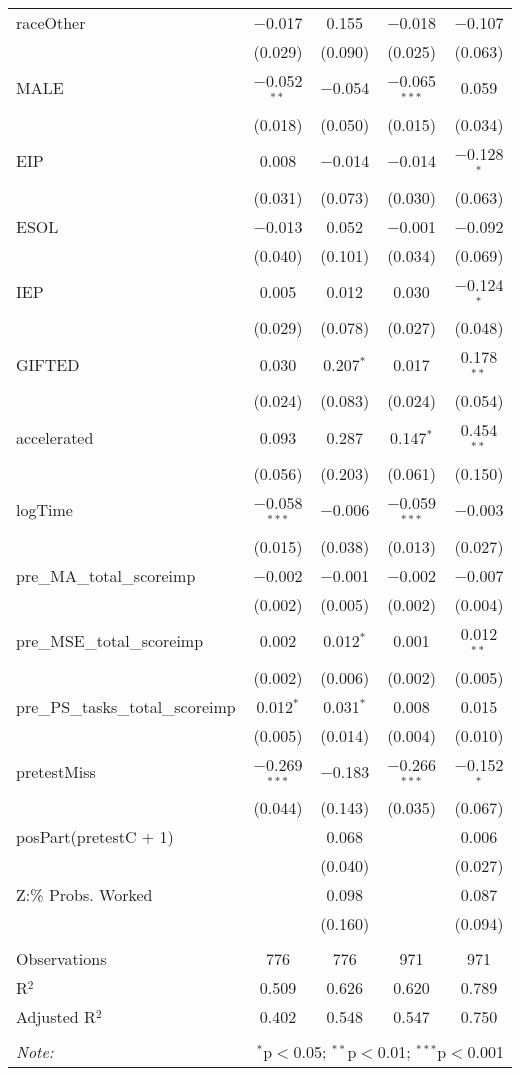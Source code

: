 \begin{table}[!htbp]
\begin{tabular}{@{\extracolsep{5pt}}lcccc}
 raceOther & $-$0.017 & 0.155 & $-$0.018 & $-$0.107 \\ 
  & (0.029) & (0.090) & (0.025) & (0.063) \\ 
 MALE & $-$0.052$^{**}$ & $-$0.054 & $-$0.065$^{***}$ & 0.059 \\ 
  & (0.018) & (0.050) & (0.015) & (0.034) \\ 
 EIP & 0.008 & $-$0.014 & $-$0.014 & $-$0.128$^{*}$ \\ 
  & (0.031) & (0.073) & (0.030) & (0.063) \\ 
 ESOL & $-$0.013 & 0.052 & $-$0.001 & $-$0.092 \\ 
  & (0.040) & (0.101) & (0.034) & (0.069) \\ 
 IEP & 0.005 & 0.012 & 0.030 & $-$0.124$^{*}$ \\ 
  & (0.029) & (0.078) & (0.027) & (0.048) \\ 
 GIFTED & 0.030 & 0.207$^{*}$ & 0.017 & 0.178$^{**}$ \\ 
  & (0.024) & (0.083) & (0.024) & (0.054) \\ 
 accelerated & 0.093 & 0.287 & 0.147$^{*}$ & 0.454$^{**}$ \\ 
  & (0.056) & (0.203) & (0.061) & (0.150) \\ 
 logTime & $-$0.058$^{***}$ & $-$0.006 & $-$0.059$^{***}$ & $-$0.003 \\ 
  & (0.015) & (0.038) & (0.013) & (0.027) \\ 
 pre\_MA\_total\_scoreimp & $-$0.002 & $-$0.001 & $-$0.002 & $-$0.007 \\ 
  & (0.002) & (0.005) & (0.002) & (0.004) \\ 
 pre\_MSE\_total\_scoreimp & 0.002 & 0.012$^{*}$ & 0.001 & 0.012$^{**}$ \\ 
  & (0.002) & (0.006) & (0.002) & (0.005) \\ 
 pre\_PS\_tasks\_total\_scoreimp & 0.012$^{*}$ & 0.031$^{*}$ & 0.008 & 0.015 \\ 
  & (0.005) & (0.014) & (0.004) & (0.010) \\ 
 pretestMiss & $-$0.269$^{***}$ & $-$0.183 & $-$0.266$^{***}$ & $-$0.152$^{*}$ \\ 
  & (0.044) & (0.143) & (0.035) & (0.067) \\ 
 posPart(pretestC + 1) &  & 0.068 &  & 0.006 \\ 
  &  & (0.040) &  & (0.027) \\ 
 Z:\% Probs. Worked &  & 0.098 &  & 0.087 \\ 
  &  & (0.160) &  & (0.094) \\ 
\hline \\[-1.8ex] 
Observations & 776 & 776 & 971 & 971 \\ 
R$^{2}$ & 0.509 & 0.626 & 0.620 & 0.789 \\ 
Adjusted R$^{2}$ & 0.402 & 0.548 & 0.547 & 0.750 \\ 
\hline 
\hline \\[-1.8ex] 
\textit{Note:}  & \multicolumn{4}{r}{$^{*}$p$<$0.05; $^{**}$p$<$0.01; $^{***}$p$<$0.001} \\ 
\end{tabular} 
\end{table} 
